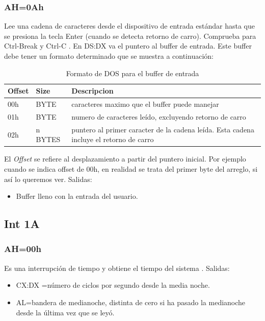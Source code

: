 \documentclass[journal]{../../IEEEtran/IEEEtran}
\begin{document}
\subsubsection{AH=0Ah}
Lee una cadena de caracteres desde el dispositivo de entrada estándar
hasta que se presiona la tecla Enter (cuando se detecta retorno de
carro). Comprueba para Ctrl-Break y Ctrl-C \cite{int21_0ah}. En DS:DX
va el puntero al buffer de entrada. Este buffer debe tener un formato
determinado que se muestra a continuación:


\begin{table}[H]
  \centering
  \caption{Formato de DOS para el buffer de entrada \cite{int21_0ah_tabla}}
  \begin{tabular}{llp{5.5cm}}
    \hline
    Offset & Size & Descripcion\\
    \hline
    00h & BYTE & caracteres maximo que el buffer puede manejar\\
    01h & BYTE & numero de caracteres leído, excluyendo retorno de carro\\
    02h & n BYTES & puntero al primer caracter de la cadena leída. Esta cadena incluye el retorno de carro\\
    \hline
  \end{tabular}
\end{table}

El \textit{Offset} se refiere al desplazamiento a partir del puntero
inicial. Por ejemplo cuando se indica offset de 00h, en realidad se
trata del primer byte del arreglo, si así lo queremos ver. Salidas:
\begin{itemize}
\item Buffer lleno con la entrada del usuario.
\end{itemize}


\subsection{Int 1A}

\subsubsection{AH=00h}
Es una interrupción de tiempo y obtiene el tiempo del sistema
\cite{int1a_00}. Salidas:
\begin{itemize}
\item CX:DX =número de ciclos por segundo desde la media noche.
\item AL=bandera de medianoche, distinta de cero si ha pasado la
  medianoche desde la última vez que se leyó.
\end{itemize}
\end{document}

